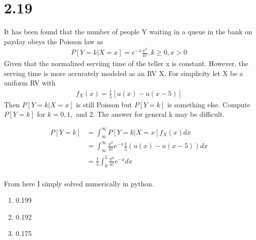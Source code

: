 \documentclass[12pt]{article}
\newcommand{\mysection}[1]{\section*{#1}}
\begin{document}
\mysection{2.19}
It has been found that the number of people Y waiting in a queue in the bank on payday obeys the Poisson 
law as
\begin{align*}
  P[Y=k|X=x]=e^{-x}\frac{x^k}{k!}, k\geq0, x>0
\end{align*}
Given that the normalized serviing time of the teller x is constant. However, the 
serving time is more accurately modeled as an RV X. For simplicity let X be a uniform RV with 
\begin{align*}
  f_X(x)=\frac{1}{5}[u(x)-u(x-5)]
\end{align*}
Then $P[Y=k|X=x]$ is still Poisson but $P[Y=k]$ is something else. Compute $P[Y=k]$ for $k=0,1, $ 
and $2$. The answer for general k may be difficult.


\begin{align*}
  P[Y=k] &=\int_\infty^\infty P[Y=k|X=x]f_X(x)dx\\
         &=\int_\infty^\infty \frac{x^k}{k!}e^{-x} \frac{1}{5}(u(x)-u(x-5))dx\\
         &=\frac{1}{5}\int_0^5 \frac{x^k}{k!}e^{-x}dx\\
\end{align*}

From here I simply solved numerically in python.

\begin{enumerate}[k=1]
  \item 
    0.199
  \item 
    0.192
  \item 
    0.175
\end{enumerate}

\newpage
\end{document}
